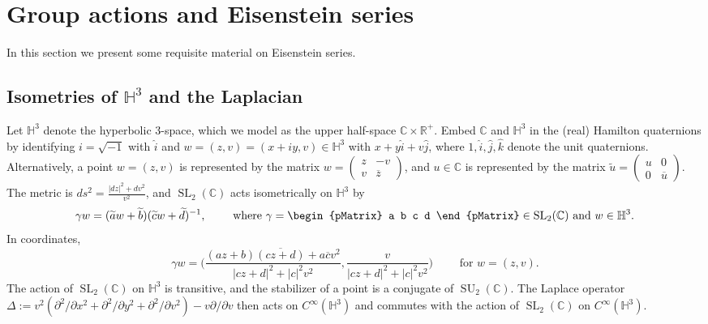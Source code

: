 \documentclass[12pt,reqno]{amsart}
\numberwithin{equation}{section}
\renewcommand{\pmatrix}[4]{\left(\begin{smallmatrix}#1 & #2 \\ #3 & #4\end{smallmatrix}\right)}
\begin{document}
 
\section{Group actions and Eisenstein series}

In this section we present some requisite material on Eisenstein series.

\subsection{Isometries of $\mathbb{H}^3$ and the Laplacian} \label{H3sec}
Let $\mathbb{H}^{3}$ denote the hyperbolic 3-space, which we model as the upper half-space $\mathbb{C} \times \mathbb{R}^{+}$.
Embed $\mathbb{C}$ and $\mathbb{H}^3$ in the (real) Hamilton quaternions  by identifying 
$i=\sqrt{-1}$ with $\hat{i}$ and 
$w=(z,v)=(x+iy,v) \in \mathbb{H}^3$ with $x+y \hat{i}+v \hat{j}$, where 
$1,\hat{i},\hat{j},\hat{k}$ denote the unit quaternions.  
Alternatively, a point $w=(z,v)$ is represented by the matrix $w=\pmatrix z {-v} {v} {\overline{z}}$,
and $u \in \mathbb{C}$ is represented by the matrix $\widetilde{u}=\pmatrix u 0 0 {\overline{u}}$.
The metric is $ds^2 = \frac{|dz|^2 + dv^2}{v^2}$, and $\operatorname{SL}_2(\mathbb{C})$ acts isometrically on $\mathbb{H}^3$ by
\begin{equation*}
\gamma w=(\widetilde{a}w+\widetilde{b})(\widetilde{c}w+\widetilde{d})^{-1}, \qquad  \text{ where }\gamma=\begin{pMatrix}
a b
c d 
\end{pMatrix} \in \operatorname{SL}_2(\mathbb{C}) \text{ and }
w \in \mathbb{H}^3.
\end{equation*}
In coordinates,
\begin{equation*}
\gamma w= \bigg( \frac{(az+b) \overline{(cz+d)}+a \overline{c} v^2}{|cz+d|^2 +|c|^2 v^2}, 
\frac{v}{|cz+d|^2+|c|^2 v^2} \bigg)
\qquad \text{ for } w=(z,v).
\end{equation*}
The action of $\operatorname{SL}_2(\mathbb{C})$ on
$\mathbb{H}^3$ is transitive, and the stabilizer of a point is a conjugate of $\operatorname{SU}_2(\mathbb{C})$.
The Laplace operator
$\Delta:=v^2( \partial^2/\partial x^2+
\partial^2/\partial y^2+\partial^2/\partial v^2)-v \partial/\partial v$
then acts on $C^{\infty}(\mathbb{H}^3)$
and commutes with the action of $\operatorname{SL}_2(\mathbb{C})$ on $C^{\infty}(\mathbb{H}^3)$.
\end{document}
